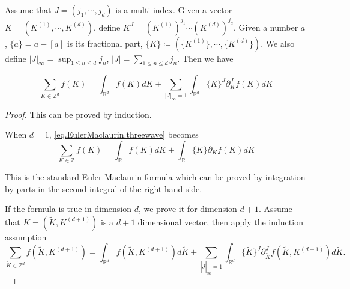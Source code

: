 \begin{thm}
Assume that $J=(j_1,\cdots,j_d)$ is a multi-index. Given a vector $K=(K^{(1)},\cdots,K^{(d)})$, define $K^J=\left(K^{(1)}\right)^{j_1}\cdots\left(K^{(d)}\right)^{j_d}$. Given a number $a$, $\{a\}=a-[a]$ is its fractional part, $\{K\}\coloneq(\{K^{(1)}\},\cdots,\{K^{(d)}\})$. We also define $|J|_{\infty}=\sup_{1\le n\le d} j_{n}$, $|J|=\sum_{1\le n\le d} j_{n}$. Then we have

\begin{equation}\label{eq.EulerMaclaurin.threewave}
    \sum_{K\in\mathbb{Z}^d} f(K)=\int_{\mathbb{R}^d} f(K)dK+\sum_{ |J|_{\infty} = 1}\int_{\mathbb{R}^d} \{K\}^{J} \partial_K^{J}f(K) dK
\end{equation}

\end{thm}
\begin{proof}
This can be proved by induction.

When $d=1$, \eqref{eq.EulerMaclaurin.threewave} becomes
\begin{equation}
    \sum_{K\in\mathbb{Z}} f(K)=\int_{\mathbb{R}} f(K)dK+\int_{\mathbb{R}} \{K\} \partial_K f(K) dK
\end{equation}

This is the standard Euler-Maclaurin formula which can be proved by integration by parts in the second integral of the right hand side.

If the formula is true in dimension $d$, we prove it for dimension $d+1$. Assume that $K=(\widetilde{K},K^{(d+1)})$ is a $d+1$ dimensional vector, then apply the induction assumption 
\begin{equation}
    \sum_{\widetilde{K}\in\mathbb{Z}^d} f(\widetilde{K},K^{(d+1)})=\int_{\mathbb{R}^d} f(\widetilde{K},K^{(d+1)})d\widetilde{K}+\sum_{ |\widetilde{J}|_{\infty} = 1}\int_{\mathbb{R}^d} \{\widetilde{K}\}^{\widetilde{J}} \partial_{\widetilde{K}}^{\widetilde{J}}f(\widetilde{K},K^{(d+1)}) d\widetilde{K}.
\end{equation}


\end{proof}
